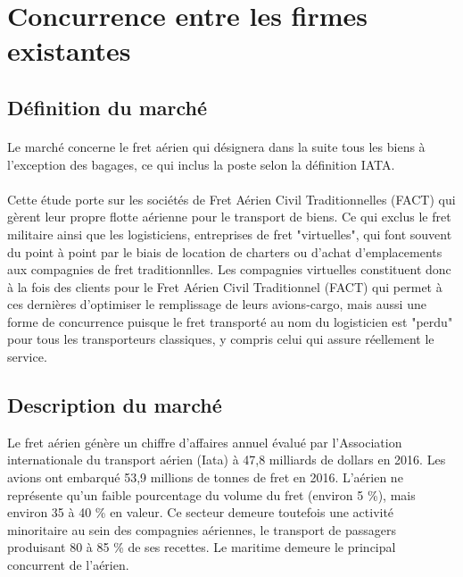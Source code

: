 
\section{Concurrence entre les firmes existantes}

\subsection{Définition du marché}

\paragraph{} Le marché concerne le fret aérien qui désignera dans la suite tous les biens à l’exception des bagages, ce qui inclus la poste selon la définition IATA.

\paragraph{}Cette étude porte sur les sociétés de Fret Aérien Civil Traditionnelles (FACT) qui gèrent leur propre flotte aérienne pour le transport de biens. Ce qui exclus le fret militaire ainsi que les logisticiens, entreprises de fret "virtuelles", qui font souvent du point à point par le biais de location de charters ou d'achat d'emplacements aux compagnies de fret traditionnlles. Les compagnies virtuelles constituent donc à la fois des clients pour le Fret Aérien Civil Traditionnel (FACT) qui permet à ces dernières d'optimiser le remplissage de leurs avions-cargo, mais aussi une forme de concurrence puisque le fret transporté au nom du logisticien est "perdu" pour tous les transporteurs classiques, y compris celui qui assure réellement le service. 

\subsection{Description du marché}
Le fret aérien génère un chiffre d’affaires annuel évalué par l’Association internationale du transport aérien (Iata) à 47,8 milliards de dollars en 2016. Les avions ont embarqué 53,9 millions de tonnes de fret en 2016. L’aérien ne représente qu’un faible pourcentage du volume du fret (environ 5 \%),
mais environ 35 à 40 \% en valeur. Ce secteur demeure toutefois une activité minoritaire au sein des compagnies aériennes, le transport de passagers produisant 80 à 85 \% de ses recettes. Le maritime demeure le principal concurrent de l’aérien. 



